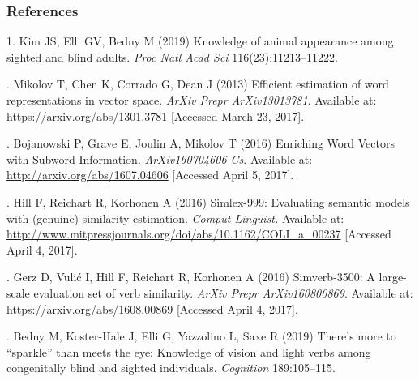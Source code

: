 \documentclass[12pt]{article}
\begin{document}
\subsubsection*{References}

1. 	Kim JS, Elli GV, Bedny M (2019) Knowledge of animal appearance among sighted and blind adults. {\it Proc Natl Acad Sci} 116(23):11213–11222.
\vspace{3mm}

. 	Mikolov T, Chen K, Corrado G, Dean J (2013) Efficient estimation of word representations in vector space. {\it ArXiv Prepr ArXiv13013781}. Available at: \url{https://arxiv.org/abs/1301.3781} [Accessed March 23, 2017].
\vspace{3mm}

. 	Bojanowski P, Grave E, Joulin A, Mikolov T (2016) Enriching Word Vectors with Subword Information. {\it ArXiv160704606 Cs}. Available at: \url{http://arxiv.org/abs/1607.04606} [Accessed April 5, 2017].
\vspace{3mm}

. 	Hill F, Reichart R, Korhonen A (2016) Simlex-999: Evaluating semantic models with (genuine) similarity estimation.  {\it Comput Linguist.} Available at: \url{http://www.mitpressjournals.org/doi/abs/10.1162/COLI_a_00237} [Accessed April 4, 2017].
\vspace{3mm}

. 	Gerz D, Vulić I, Hill F, Reichart R, Korhonen A (2016) Simverb-3500: A large-scale evaluation set of verb similarity.  {\it ArXiv Prepr ArXiv160800869}. Available at: \url{https://arxiv.org/abs/1608.00869} [Accessed April 4, 2017].
\vspace{3mm}

. 	Bedny M, Koster-Hale J, Elli G, Yazzolino L, Saxe R (2019) There’s more to ``sparkle'' than meets the eye: Knowledge of vision and light verbs among congenitally blind and sighted individuals.  {\it Cognition} 189:105–115.
\end{document}
